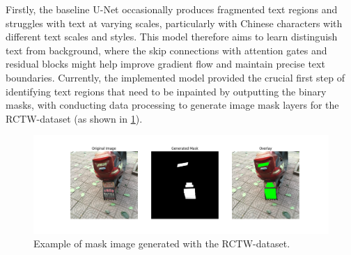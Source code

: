 \documentclass[10pt,twocolumn,letterpaper]{article}
\begin{document}
Firstly, the baseline U-Net occasionally produces fragmented text regions and struggles with text at varying scales, particularly with Chinese characters 
with different text scales and styles. This model therefore aims to learn distinguish text from background, where the skip connections with attention gates 
and residual blocks might help improve gradient flow and maintain precise text boundaries. Currently, the implemented model provided the crucial first step 
of identifying text regions that need to be inpainted by outputting the binary masks, with conducting data processing to generate image mask layers for the 
RCTW-dataset (as shown in \cref{fig:verify}).

\begin{figure}[t]
    \centering
    \includegraphics[width=\linewidth]{figures/milestone/verify_1.png}
    \caption{Example of mask image generated with the RCTW-dataset.}
    \label{fig:verify}
\end{figure}


\end{document}

